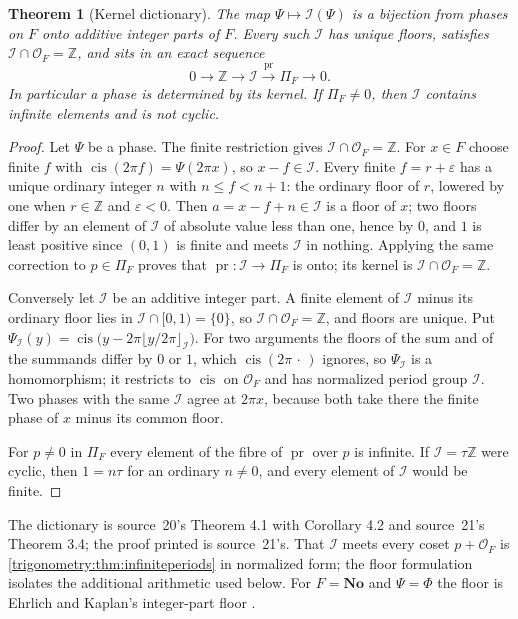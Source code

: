 \documentclass[11pt,letterpaper]{article}
\numberwithin{equation}{section}
\newtheorem{theorem}{Theorem}[section]
\theoremstyle{definition}
\theoremstyle{remark}
\newcommand{\No}{\mathbf{No}}
\newcommand{\Z}{\mathbb Z}
\newcommand{\OO}{\mathcal O}
\newcommand{\eps}{\varepsilon}
\newcommand{\cis}{\operatorname{cis}}
\newcommand{\pr}{\operatorname{pr}}
\newcommand{\cI}{\mathcal I}
\begin{document}
\begin{theorem}[Kernel dictionary]\label{trigonometry:per:thm:dictionary}
The map $\Psi\mapsto\cI(\Psi)$ is a bijection from phases on $F$ onto additive integer parts of $F$.
Every such $\cI$ has unique floors, satisfies $\cI\cap\OO_F=\Z$, and sits in an exact sequence
\begin{equation}\label{trigonometry:per:eq:periodsequence}
 0\longrightarrow\Z\longrightarrow\cI\xrightarrow{\ \pr\ }\Pi_F\longrightarrow0 .
\end{equation}
In particular a phase is determined by its kernel. If $\Pi_F\ne0$, then $\cI$ contains infinite
elements and is not cyclic.
\end{theorem}
\begin{proof}
Let $\Psi$ be a phase. The finite restriction gives $\cI\cap\OO_F=\Z$. For $x\in F$ choose finite $f$
with $\cis(2\pi f)=\Psi(2\pi x)$, so $x-f\in\cI$. Every finite $f=r+\eps$ has a unique ordinary integer
$n$ with $n\le f<n+1$: the ordinary floor of $r$, lowered by one when $r\in\Z$ and $\eps<0$. Then
$a=x-f+n\in\cI$ is a floor of $x$; two floors differ by an element of $\cI$ of absolute value less
than one, hence by $0$, and $1$ is least positive since $(0,1)$ is finite and meets $\cI$ in nothing.
Applying the same correction to $p\in\Pi_F$ proves that $\pr:\cI\to\Pi_F$ is onto; its kernel is
$\cI\cap\OO_F=\Z$.

Conversely let $\cI$ be an additive integer part. A finite element of $\cI$ minus its ordinary floor
lies in $\cI\cap[0,1)=\{0\}$, so $\cI\cap\OO_F=\Z$, and floors are unique. Put
$\Psi_{\cI}(y)=\cis\bigl(y-2\pi\lfloor y/2\pi\rfloor_{\cI}\bigr)$. For two arguments the floors of
the sum and of the summands differ by $0$ or $1$, which $\cis(2\pi\,\cdot\,)$ ignores, so
$\Psi_{\cI}$ is a homomorphism; it restricts to $\cis$ on $\OO_F$ and has normalized period group
$\cI$. Two phases with the same $\cI$ agree at $2\pi x$, because both take there the finite phase of
$x$ minus its common floor.

For $p\ne0$ in $\Pi_F$ every element of the fibre of $\pr$ over $p$ is infinite. If $\cI=\tau\Z$ were
cyclic, then $1=n\tau$ for an ordinary $n\ne0$, and every element of $\cI$ would be finite.
\end{proof}
The dictionary is source~20's Theorem 4.1 with Corollary 4.2 and source~21's Theorem 3.4; the proof
printed is source~21's. That $\cI$ meets every coset $p+\OO_F$ is
\cref{trigonometry:thm:infiniteperiods} in normalized form; the floor formulation isolates the
additional arithmetic used below. For $F=\No$ and $\Psi=\Phi$ the floor is Ehrlich and Kaplan's
integer-part floor \cite[\S11]{EK}.
\end{document}
